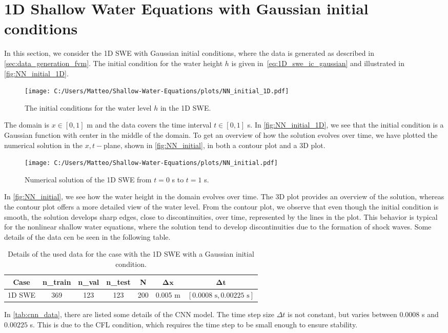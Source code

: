 \section{1D Shallow Water Equations with Gaussian initial conditions}
In this section, we consider the 1D SWE with Gaussian initial conditions, where the data is generated as described in \autoref{sec:data_generation_fvm}.
The initial condition for the water height $h$ is given in~\eqref{eq:1D_swe_ic_gaussian} and illustrated in \autoref{fig:NN_initial_1D}.
\begin{figure}[H]
    \centering
    \texttt{[image: C:/Users/Matteo/Shallow-Water-Equations/plots/NN\_initial\_1D.pdf]}
    \caption{The initial conditions for the water level $h$ in the 1D SWE.}\label{fig:NN_initial_1D}
\end{figure}
The domain is $ x \in [0, 1]$ m and the data covers the time interval $t \in [0, 1]$ s.
In \autoref{fig:NN_initial_1D}, we see that the initial condition is a Gaussian function with center in the middle of the domain.
To get an overview of how the solution evolves over time, we have plotted the numerical solution in the $x,t-$plane, shown in \autoref{fig:NN_initial}, in both a contour plot and a 3D plot.
\begin{figure}[H]
    \hspace{1.7cm} %
    \texttt{[image: C:/Users/Matteo/Shallow-Water-Equations/plots/NN\_initial.pdf]}
    \caption{Numerical solution of the 1D SWE from $t = 0$ s to $t = 1$ s.}\label{fig:NN_initial}
\end{figure}
In \autoref{fig:NN_initial}, we see how the water height in the domain evolves over time.
The 3D plot provides an overview of the solution, whereas the contour plot offers a more detailed view of the water level.
From the contour plot, we observe that even though the initial condition is smooth, the solution develops sharp edges, close to discontinuities, over time, represented by the lines in the plot.
This behavior is typical for the nonlinear shallow water equations, where the solution tend to develop discontinuities due to the formation of shock waves.
Some details of the data cen be seen in the following table.
\begin{table}[H]
    \centering
    \begin{tabular}{c|cccccc}
        \textbf{Case} & \textbf{n\_train} & \textbf{n\_val} & \textbf{n\_test} & \textbf{N} & $\mathbf{\Delta x}$ & $\mathbf{\Delta t}$ \\
        \hline
        1D SWE & 369 & 123 & 123 & 200 & 0.005 m & $[0.0008 \text{ s}, 0.00225 \text{ s}]$ \\
    \end{tabular}
    \caption{Details of the used data for the case with the 1D SWE with a Gaussian initial condition.}\label{tab:cnn_data}
\end{table}
In \autoref{tab:cnn_data}, there are listed some details of the CNN model.
The time step size $\Delta t$ is not constant, but varies between $0.0008$ s and $0.00225$ s.
This is due to the CFL condition, which requires the time step to be small enough to ensure stability.



